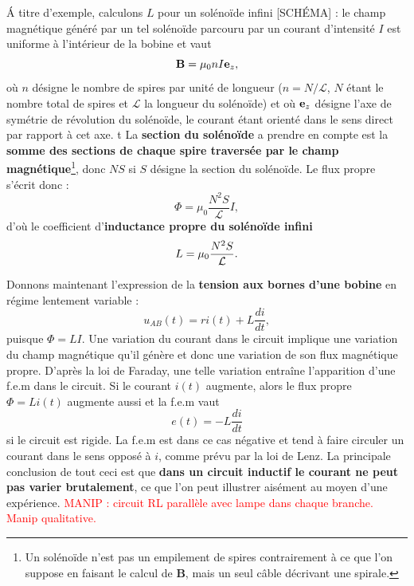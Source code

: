 \documentclass[11pt,a4paper]{report}
\begin{document}
\'A titre d'exemple, calculons $L$ pour un solénoïde infini [SCH\'EMA] : le champ magnétique généré par un tel solénoïde parcouru par un courant d'intensité $I$ est uniforme à l'intérieur de la bobine et vaut
\begin{equation}
	\bold{B} = \mu_0 n I \bold{e}_z,
\end{equation}
où $n$ désigne le nombre de spires par unité de longueur ($n = N/\mathcal{L}$, $N$ étant le nombre total de spires et $\mathcal{L}$ la longueur du solénoïde) et où $\bold{e}_z$ désigne l'axe de symétrie de révolution du solénoïde, le courant étant orienté dans le sens direct par rapport à cet axe.
t
La \textbf{section du solénoïde} a prendre en compte est la \textbf{somme des sections de chaque spire traversée par le champ magnétique}\footnote{Un solénoïde n'est pas un empilement de spires contrairement à ce que l'on suppose en faisant le calcul de $\textbf{B}$, mais un seul câble décrivant une spirale.}, donc $N S$ si $S$ désigne la section du solénoïde. 
Le flux propre s'écrit donc :
\begin{equation}
	\Phi = \mu_0\frac{N^2 S}{\mathcal{L}}I,
\end{equation}
d'où le coefficient d'\textbf{inductance propre du solénoïde infini}
\begin{equation}
	L =  \mu_0\frac{N^2 S}{\mathcal{L}}.\\
\end{equation}

Donnons maintenant l'expression de la \textbf{tension aux bornes d'une bobine} en régime lentement variable :
\begin{equation}
	u_{AB}(t) = ri(t) + L\frac{di}{dt},
\end{equation}
puisque $\Phi = LI$.
Une variation du courant dans le circuit implique une variation du champ magnétique qu'il génère et donc une variation de son flux magnétique propre. D'après la loi de Faraday, une telle variation entraîne l'apparition d'une f.e.m dans le circuit. Si le courant $i(t)$ augmente, alors le flux propre $\Phi = L i(t)$ augmente aussi et la f.e.m vaut
\begin{equation}
	e(t) = - L\frac{di}{dt}
\end{equation}
si le circuit est rigide. La f.e.m est dans ce cas négative et tend à faire circuler un courant dans le sens opposé à $i$, comme prévu par la loi de Lenz. La principale conclusion de tout ceci est que \textbf{dans un circuit inductif le courant ne peut pas varier brutalement}, ce que l'on peut illustrer aisément au moyen d'une expérience. \textcolor{red}{MANIP : circuit RL parallèle avec lampe dans chaque branche. Manip qualitative.}\\
\end{document}
